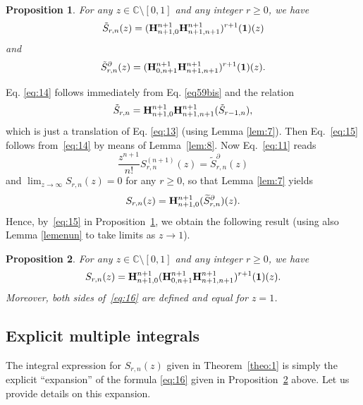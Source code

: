 \documentclass[reqno,12pt]{amsart}
\numberwithin{equation}{section}
\newtheorem{prop}{Proposition}
\theoremstyle{remark}
\newcommand{\BBB}{{\bf H}}
\newcommand{\opa}{\BBB^{n+1}_{n+1,0}\BBB^{n+1}_{n+1,n+1}}
\newcommand{\opb}{\BBB^{n+1}_{0,n+1}\BBB^{n+1}_{n+1,n+1}}
\begin{document}
\begin{prop}\label{prop:1} For any $z\in \mathbb{C}\setminus[0,1]$ and any integer $r\ge 0$, we have
\begin{equation}\label{eq:14}
\tilde{S}_{r,n}(z)= (\opa)^{r+1} (\boldsymbol{1})(z) 
\end{equation}
 and
\begin{equation}\label{eq:15}
\tilde{S}_{r,n}^{\partial}(z)=(\opb)^{r+1} (\boldsymbol{1})(z).
\end{equation}
\end{prop} 
Eq. \eqref{eq:14} follows immediately from Eq. \eqref{eq59bis} and the relation 
$$\tilde{S}_{r,n} = \opa (\tilde{S}_{r-1,n}),$$
 which is just a translation of Eq. \eqref{eq:13} (using Lemma \ref{lem:7}). Then
Eq.~\eqref{eq:15} follows from~\eqref{eq:14} by means of Lemma~\ref{lem:8}.  Now Eq.~\eqref{eq:11} reads
\begin{equation}\label{eq:15bis}
\frac{z^{n+1}}{n!}S_{r,n}^{(n+1)}(z) = \tilde{S}_{r,n}^{\partial}(z)
\end{equation}
and  $\lim_{z\to \infty} S_{r,n} (z)=0$ for any $r\ge 0$, so that Lemma \ref{lem:7} yields
$$
S_{r,n}(z)=\BBB^{ n+1}_{n+1,0} (\widetilde{S}_{r,n}^{\partial})(z).
$$
Hence, by~\eqref{eq:15} in Proposition~\ref{prop:1}, we obtain the following result 
(using also Lemma \ref{lemenun} to take limits as $z\to 1$).
\begin{prop}\label{prop:2} For any $z\in \mathbb{C}\setminus[0,1]$ and any integer $r\ge 0$, we have 
\begin{equation}\label{eq:16}
S_{r,n}(z)=\BBB^{ n+1}_{n+1,0} (\opb)^{r+1} (\boldsymbol{1})(z).
\end{equation}
 Moreover, both sides of~\eqref{eq:16} are defined 
and equal for $z=1$.
\end{prop}

\subsection{Explicit multiple integrals} \label{subseccalcint}
 

The integral expression for $S_{r,n}(z)$ given in Theorem~\ref{theo:1} is simply the  
explicit ``expansion'' of the formula \eqref{eq:16} given in Proposition~\ref{prop:2} above. Let us provide 
details on this expansion.
\end{document}
